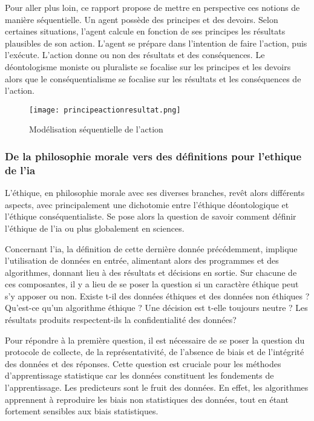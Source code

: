 Pour aller plus loin, ce rapport propose de mettre en perspective ces notions de manière séquentielle. Un agent possède des principes et des devoirs. Selon certaines situations, l'agent calcule en fonction de ses principes les résultats plausibles de son action. L'agent se prépare dans l'intention de faire l'action, puis l'exécute. L'action donne ou non des résultats et des conséquences. Le déontologisme moniste ou pluraliste se focalise sur les principes et les devoirs alors que le conséquentialisme se focalise sur les résultats et les conséquences de l'action.

\begin{figure}[ht]
  \texttt{[image: principeactionresultat.png]}
  \caption{Modélisation séquentielle de l'action}
\end{figure}
\subsubsection{De la philosophie morale vers des définitions pour l'ethique de l'\gls{ia}}

L'éthique, en philosophie morale avec ses diverses branches, revêt alors différents aspects, avec principalement une dichotomie entre l'éthique déontologique et l'éthique conséquentialiste. Se pose alors la question de savoir comment définir l'éthique de l'\gls{ia} ou plus globalement en sciences.

Concernant l'\gls{ia}, la définition de cette dernière donnée précédemment, implique l'utilisation de données en entrée, alimentant alors des programmes et des algorithmes, donnant lieu à des résultats et décisions en sortie. Sur chacune de ces composantes, il y a lieu de se poser la question si un caractère éthique peut s'y apposer ou non. Existe t-il des données éthiques et des données non éthiques ? Qu'est-ce qu'un algorithme éthique ? Une décision est t-elle toujours neutre ? Les résultats produits respectent-ils la confidentialité des données?

Pour répondre à la première question, il est nécessaire de se poser la question du protocole de collecte, de la représentativité, de l'absence de biais et de l'intégrité des données et des réponses. Cette question est cruciale pour les méthodes d'apprentissage statistique car les données constituent les fondements de l'apprentissage. Les predicteurs sont le fruit des données. En effet, les algorithmes apprennent à reproduire les biais non statistiques des données, tout en étant fortement sensibles aux biais statistiques.

